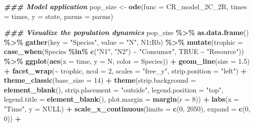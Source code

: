 \documentclass[
]{book}
\newenvironment{Shaded}{\begin{snugshade}}{\end{snugshade}}
\newcommand{\AttributeTok}[1]{\textcolor[rgb]{0.13,0.29,0.53}{#1}}
\newcommand{\ConstantTok}[1]{\textcolor[rgb]{0.56,0.35,0.01}{#1}}
\newcommand{\DecValTok}[1]{\textcolor[rgb]{0.00,0.00,0.81}{#1}}
\newcommand{\DocumentationTok}[1]{\textcolor[rgb]{0.56,0.35,0.01}{\textbf{\textit{#1}}}}
\newcommand{\FloatTok}[1]{\textcolor[rgb]{0.00,0.00,0.81}{#1}}
\newcommand{\FunctionTok}[1]{\textcolor[rgb]{0.13,0.29,0.53}{\textbf{#1}}}
\newcommand{\NormalTok}[1]{#1}
\newcommand{\OtherTok}[1]{\textcolor[rgb]{0.56,0.35,0.01}{#1}}
\newcommand{\SpecialCharTok}[1]{\textcolor[rgb]{0.81,0.36,0.00}{\textbf{#1}}}
\newcommand{\StringTok}[1]{\textcolor[rgb]{0.31,0.60,0.02}{#1}}
\begin{document}
\begin{Shaded}
\begin{Highlighting}[]
\DocumentationTok{\#\#\# Model application}
\NormalTok{pop\_size }\OtherTok{\textless{}{-}} \FunctionTok{ode}\NormalTok{(}\AttributeTok{func =}\NormalTok{ CR\_model\_2C\_2R, }\AttributeTok{times =}\NormalTok{ times, }\AttributeTok{y =}\NormalTok{ state, }\AttributeTok{parms =}\NormalTok{ parms)}


\DocumentationTok{\#\#\# Visualize the population dynamics}
\NormalTok{pop\_size }\SpecialCharTok{\%\textgreater{}\%}
  \FunctionTok{as.data.frame}\NormalTok{() }\SpecialCharTok{\%\textgreater{}\%}
  \FunctionTok{gather}\NormalTok{(}\AttributeTok{key =} \StringTok{"Species"}\NormalTok{, }\AttributeTok{value =} \StringTok{"N"}\NormalTok{, N1}\SpecialCharTok{:}\NormalTok{Rb) }\SpecialCharTok{\%\textgreater{}\%}
  \FunctionTok{mutate}\NormalTok{(}\AttributeTok{trophic =} \FunctionTok{case\_when}\NormalTok{(Species }\SpecialCharTok{\%in\%} \FunctionTok{c}\NormalTok{(}\StringTok{"N1"}\NormalTok{, }\StringTok{"N2"}\NormalTok{) }\SpecialCharTok{\textasciitilde{}} \StringTok{"Consumer"}\NormalTok{,}
                             \ConstantTok{TRUE} \SpecialCharTok{\textasciitilde{}} \StringTok{"Resource"}\NormalTok{)) }\SpecialCharTok{\%\textgreater{}\%}
  \FunctionTok{ggplot}\NormalTok{(}\FunctionTok{aes}\NormalTok{(}\AttributeTok{x =}\NormalTok{ time, }\AttributeTok{y =}\NormalTok{ N, }\AttributeTok{color =}\NormalTok{ Species)) }\SpecialCharTok{+} 
  \FunctionTok{geom\_line}\NormalTok{(}\AttributeTok{size =} \FloatTok{1.5}\NormalTok{) }\SpecialCharTok{+}
  \FunctionTok{facet\_wrap}\NormalTok{(}\SpecialCharTok{\textasciitilde{}}\NormalTok{ trophic, }
             \AttributeTok{ncol =} \DecValTok{2}\NormalTok{, }
             \AttributeTok{scales =} \StringTok{"free\_y"}\NormalTok{,}
             \AttributeTok{strip.position =} \StringTok{"left"}\NormalTok{) }\SpecialCharTok{+}
  \FunctionTok{theme\_classic}\NormalTok{(}\AttributeTok{base\_size =} \DecValTok{14}\NormalTok{) }\SpecialCharTok{+}
  \FunctionTok{theme}\NormalTok{(}\AttributeTok{strip.background =} \FunctionTok{element\_blank}\NormalTok{(),}
        \AttributeTok{strip.placement =} \StringTok{"outside"}\NormalTok{,}
        \AttributeTok{legend.position =} \StringTok{"top"}\NormalTok{,}
        \AttributeTok{legend.title =} \FunctionTok{element\_blank}\NormalTok{(),}
        \AttributeTok{plot.margin =} \FunctionTok{margin}\NormalTok{(}\AttributeTok{r =} \DecValTok{8}\NormalTok{)) }\SpecialCharTok{+} 
  \FunctionTok{labs}\NormalTok{(}\AttributeTok{x =} \StringTok{"Time"}\NormalTok{, }\AttributeTok{y =} \ConstantTok{NULL}\NormalTok{) }\SpecialCharTok{+}
  \FunctionTok{scale\_x\_continuous}\NormalTok{(}\AttributeTok{limits =} \FunctionTok{c}\NormalTok{(}\DecValTok{0}\NormalTok{, }\DecValTok{2050}\NormalTok{), }\AttributeTok{expand =} \FunctionTok{c}\NormalTok{(}\DecValTok{0}\NormalTok{, }\DecValTok{0}\NormalTok{)) }\SpecialCharTok{+}

\end{Highlighting}
\end{Shaded}
\end{document}
